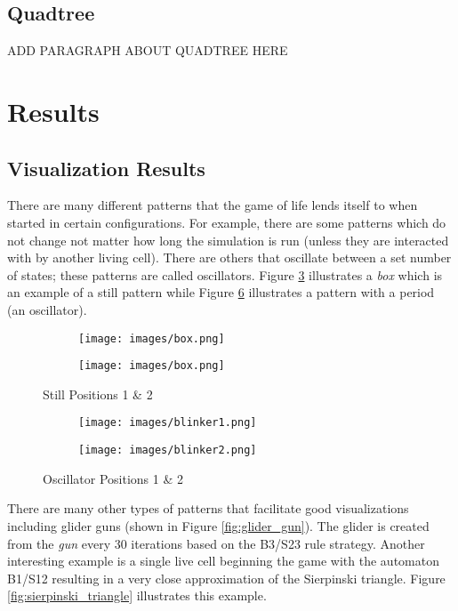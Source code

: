 \documentclass[11pt]{article}
\begin{document}
\subsection*{Quadtree}
ADD PARAGRAPH ABOUT QUADTREE HERE

\section{Results}
\subsection{Visualization Results}
There are many different patterns that the game of life lends itself to when started in certain configurations.  For example, there are some patterns which do not change not matter how long the simulation is run (unless they are interacted with by another living cell).  There are others that oscillate between a set number of states; these patterns are called oscillators.  Figure \ref{fig:still} illustrates a \textit{box} which is an example of a still pattern while Figure \ref{fig:oscillator} illustrates a pattern with a period (an oscillator).
\begin{figure}[!ht]
	\centering
	\begin{subfigure}{.45\textwidth}
		\centering
  	  	\texttt{[image: images/box.png]}
  	  	\label{fig:box1}
	\end{subfigure}
	\begin{subfigure}{.45\textwidth}
  	  	\centering
  	  	\texttt{[image: images/box.png]}
  	  	\label{fig:box2}
	\end{subfigure}
	\caption{Still Positions 1 \& 2}
	\label{fig:still}
\end{figure}

\begin{figure}[!ht]
	\centering
	\begin{subfigure}{.45\textwidth}
		\centering
  	  	\texttt{[image: images/blinker1.png]}
  	  	\label{fig:blinker1}
	\end{subfigure}
	\begin{subfigure}{.45\textwidth}
  	  	\centering
  	  	\texttt{[image: images/blinker2.png]}
  	  	\label{fig:blinker2}
	\end{subfigure}
	\caption{Oscillator Positions 1 \& 2}
	\label{fig:oscillator}
\end{figure}

There are many other types of patterns that facilitate good visualizations including glider guns (shown in Figure \ref{fig:glider_gun}).  The glider is created from the \textit{gun} every 30 iterations based on the B3/S23 rule strategy.  Another interesting example is a single live cell beginning the game with the automaton B1/S12 resulting in a very close approximation of the Sierpinski triangle.  Figure \ref{fig:sierpinski_triangle} illustrates this example.
\end{document}
